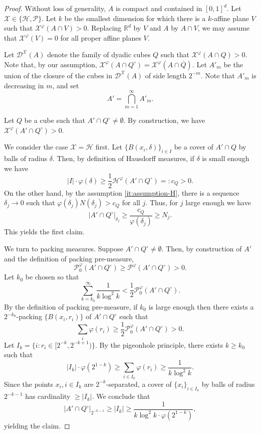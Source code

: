 \documentclass[12pt]{amsart}
\renewcommand{\phi}{\varphi}
\def\R{{\mathbb{R}}}
\numberwithin{theorem}{section}
\numberwithin{equation}{section}
\begin{document}
\begin{proof}
    Without loss of generality, $A$ is compact and contained in $[0,1]^d$. Let $\mathcal{X}\in\{\mathcal{H},\mathcal{P}\}$. Let $k$ be the smallest dimension for which there is a $k$-affine plane $V$ such that $\mathcal{X}^\phi(A\cap V)>0$. Replacing $\R^d$ by $V$ and $A$ by $A\cap V$, we may assume that $\mathcal{X}^\phi(V)=0$ for all proper affine planes $V$.

    Let $\mathcal{D}^{\mathcal{X}}(A)$ denote the family of dyadic cubes $Q$ such that $\mathcal{X}^\phi(A\cap Q)>0$. Note that, by our assumption, $\mathcal{X}^\phi(A\cap Q^{\circ})=\mathcal{X}^\phi(A\cap \overline{Q})$. Let $A'_m$ be the union of the closure of the cubes in $\mathcal{D}^{\mathcal{X}}(A)$ of side length $2^{-m}$. Note that $A'_m$ is decreasing in $m$, and set
    \[
       A' = \bigcap_{m=1}^\infty A'_m.
    \]

    Let $Q$ be a cube such that $A'\cap Q^{\circ}\neq \emptyset$. By construction, we have $\mathcal{X}^\phi(A'\cap Q^{\circ})>0$.
    

    We consider the case $\mathcal{X}=\mathcal{H}$ first. Let $\{ B(x_i,\delta)\}_{i\in I}$ be a cover of $A'\cap Q$ by balls of radius $\delta$. Then, by definition of Hausdorff measures, if $\delta$ is small enough we have
    \[
        |I|\cdot \phi(\delta) \ge \frac{1}{2}\mathcal{H}^\phi(A'\cap Q^{\circ}) =: c_Q > 0.
    \]
    On the other hand, by the assumption \ref{it:assumption-H}, there is a sequence $\delta_j\to 0$ such that $\phi(\delta_j) N(\delta_j) >c_Q$ for all $j$. Thus, for $j$ large enough we have
    \[
     |A'\cap Q^{\circ}|_{\delta_j} \ge \frac{c_Q}{\phi(\delta_j)}  \ge N_j.
    \]
    This yields the first claim.

    We turn to packing measures. Suppose $A' \cap Q^{\circ} \neq \emptyset$. Then, by construction of $A'$ and the definition of packing pre-measure,
    \[
        \mathcal{P}_0^\phi(A'\cap Q^{\circ}) \ge \mathcal{P}^\phi(A'\cap Q^{\circ})>0.
    \]
    Let $k_0$ be chosen so that
    \[
        \sum_{k=k_0}^\infty \frac{1}{k\log^2 k} < \frac{1}{2}\mathcal{P}_0^\phi(A'\cap Q^{\circ}).
    \]
    By the definition of packing pre-measure, if $k_0$ is large enough then there exists a $2^{-k_0}$-packing $\{ B(x_i,r_i) \} $ of $A'\cap Q^{\circ}$ such that
    \[
        \sum_{i} \phi(r_i) \ge \frac{1}{2}\mathcal{P}_0^\phi(A'\cap Q^{\circ})>0.
    \]
    Let $I_k = \{ i: r_i \in [2^{-k}, 2^{-k+1}) \}$. By the pigeonhole principle, there exists $k\ge k_0$ such that
    \[
        |I_k| \cdot \phi(2^{1-k}) \ge \sum_{i\in I_k} \phi(r_i) \ge \frac{1}{k\log^2 k}.
    \]
    Since the points $x_i, i \in I_k$ are $2^{-k}$-separated, a cover of $\{x_i\}_{i\in I_k}$ by balls of radius $2^{-k-1}$ has cardinality $\ge |I_k|$.  We conclude that
    \[
        |A'\cap Q^{\circ}|_{2^{-k-1}} \ge |I_k|\ge \frac{1}{k\log^2 k\cdot  \phi(2^{1-k})},
    \]
    yielding the claim.
\end{proof}
\end{document}
